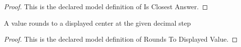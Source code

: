 \begin{proof}
  This is the declared model definition of Is Closest Answer.
\end{proof}
\begin{definition}
  \label{def:physics:phyx-mini-0626:phyxminiproblems-problemphyxmini0626-roundstodisplayedvalue}
  A value rounds to a displayed center at the given decimal step
\end{definition}
\begin{proof}
  This is the declared model definition of Rounds To Displayed Value.
\end{proof}

